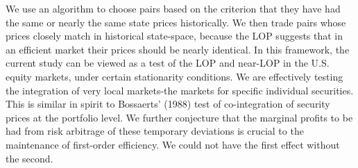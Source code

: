 We use an algorithm to choose pairs based on the criterion that they have had the same or nearly the same state prices historically. We then trade pairs whose prices closely match in historical state-space, because the LOP suggests that in an efficient market their prices should be nearly identical. In
this framework, the current study can be viewed as a test of the LOP and near-LOP in the U.S. equity markets, under certain stationarity conditions. We are effectively testing the integration of very local markets-the markets
for specific individual securities. This is similar in spirit to Bossaerts' (1988) test of co-integration of security prices at the portfolio level. We further conjecture that the marginal profits to be had from risk arbitrage of these temporary deviations is crucial to the maintenance of first-order efficiency. We could not have the first effect without the second.
